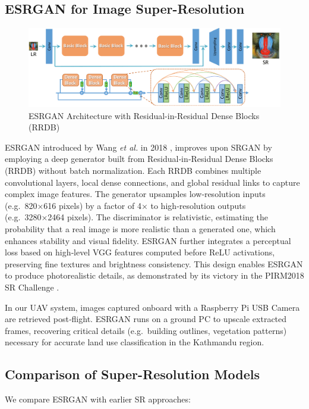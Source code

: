\subsection{ESRGAN for Image Super-Resolution}
\begin{figure}[H]
    \centering
    \includegraphics[width=0.85\linewidth]{images/esrganarchi.png}
    \caption{ESRGAN Architecture with Residual-in-Residual Dense Blocks (RRDB)}
    \label{fig:esrgan}
\end{figure}
ESRGAN introduced by Wang \emph{et al.} in 2018 \cite{wang2018esrgan}, improves upon SRGAN by employing a deep generator built from Residual‑in‑Residual Dense Blocks (RRDB) without batch normalization. Each RRDB combines multiple convolutional layers, local dense connections, and global residual links to capture complex image features. The generator upsamples low‑resolution inputs (e.g.\ 820×616 pixels) by a factor of 4× to high‑resolution outputs (e.g.\ 3280×2464 pixels). The discriminator is relativistic, estimating the probability that a real image is more realistic than a generated one, which enhances stability and visual fidelity. ESRGAN further integrates a perceptual loss based on high‑level VGG features computed before ReLU activations, preserving fine textures and brightness consistency. This design enables ESRGAN to produce photorealistic details, as demonstrated by its victory in the PIRM2018 SR Challenge \cite{wang2018esrgan}.

In our UAV system, images captured onboard with a Raspberry Pi USB Camera are retrieved post‑flight. ESRGAN runs on a ground PC to upscale extracted frames, recovering critical details (e.g.\ building outlines, vegetation patterns) necessary for accurate land use classification in the Kathmandu region.

\subsection{Comparison of Super-Resolution Models}
We compare ESRGAN with earlier SR approaches:

